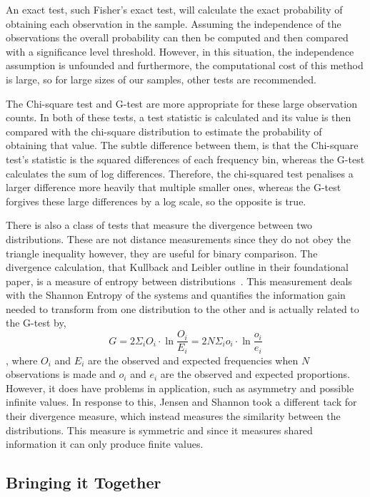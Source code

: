 \documentclass[ %
                    author={Samuel Russell},
                supervisor={Prof. Bogdan Warinschi},
                    degree={MEng},
                     title={Innocuous Ciphertexts},
                  subtitle={The DE-CENSOR Scheme},
                      type={research},
                      year={2018} ]{dissertation}
\begin{document}
An exact test, such Fisher's exact test, will calculate the exact probability of obtaining each observation in the sample.
Assuming the independence of the observations the overall probability can then be computed and then compared with a significance level threshold.
However, in this situation, the independence assumption is unfounded and furthermore, the computational cost of this method is large, so for large sizes of our samples, other tests are recommended.

The Chi-square test and G-test are more appropriate for these large observation counts. In both of these tests, a test statistic is calculated and its value is then compared with the chi-square distribution to estimate the probability of obtaining that value. 
The subtle difference between them, is that the Chi-square test's statistic is the squared differences of each frequency bin, whereas the G-test calculates the sum of log differences.
Therefore, the chi-squared test penalises a larger difference more heavily that multiple smaller ones, whereas the G-test forgives these large differences by a log scale, so the opposite is true.

There is also a class of tests that measure the divergence between two distributions.
These are not distance measurements since they do not obey the triangle inequality however, they are useful for binary comparison.
The divergence calculation, that Kullback and Leibler outline in their foundational paper, is a measure of entropy between distributions~\cite{dist}. 
This measurement deals with the Shannon Entropy of the systems and quantifies the information gain needed to transform from one distribution to the other and is actually related to the G-test by,
$$G = 2 \Sigma_i O_i \cdot \ln{\frac{O_i}{E_i}} = 2N \Sigma_i o_i \cdot \ln{\frac{o_i}{e_i}}$$,
where $O_i$ and $E_i$ are the observed and expected frequencies when $N$ observations is made and $o_i$ and $e_i$ are the observed and expected proportions.
However, it does have problems in application, such as asymmetry and possible infinite values.
In response to this, Jensen and Shannon took a different tack for their divergence measure, which instead measures the similarity between the distributions. This measure is symmetric and since it measures shared information it can only produce finite values.

\subsection{Bringing it Together}
\end{document}
